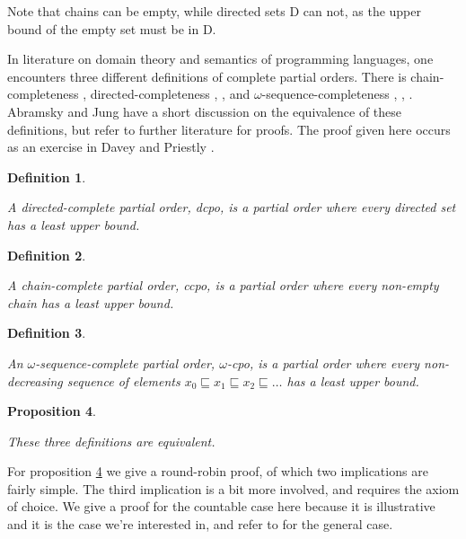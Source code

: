 \documentclass[a4paper]{article}
\newcommand{\below}{\sqsubseteq}
\newtheorem{definition}{Definition}[section]
\newtheorem{proposition}[definition]{Proposition}
\begin{document}
Note that chains can be empty, while directed sets D can not, as the upper bound
of the empty set must be in D.

In literature on domain theory and semantics of programming languages, one
encounters three different definitions of complete partial orders.  There is
chain-completeness \cite{Moschovakis1994}, directed-completeness
\cite{DaveyPriestly1990}, \cite{Gunter1992}, and $\omega$-sequence-completeness
\cite{Allison1986}, \cite{Winskel1993}, \cite{BarrWells1990}. Abramsky and Jung
\cite{Abramsky1994} have a short discussion on the equivalence of these
definitions, but refer to further literature for proofs. The proof given here
occurs as an exercise in Davey and Priestly \cite{DaveyPriestly1990}.


\begin{definition} \label{defCpoDirectedComplete}

A directed-complete partial order, \emph{dcpo}, is a partial order where every
directed set has a least upper bound.

\end{definition}


\begin{definition} \label{defCpoChainComplete}

A chain-complete partial order, \emph{ccpo}, is a partial order where every
non-empty chain has a least upper bound.

\end{definition}


\begin{definition} \label{defCpoOmegaSequenceComplete}

An $\omega$-sequence-complete partial order, \emph{$\omega$-cpo}, is a partial
order where every non-decreasing sequence of elements $x_0 \below x_1 \below x_2
\below \ldots $ has a least upper bound.

\end{definition}


\begin{proposition} \label{propDefinitionsAreEquivalent}

These three definitions are equivalent.

\end{proposition}

For proposition \ref{propDefinitionsAreEquivalent} we give a round-robin proof,
of which two implications are fairly simple. The third implication is a bit more
involved, and requires the axiom of choice. We give a proof for the countable
case here because it is illustrative and it is the case we're interested in, and
refer to \cite{Markowsky1976} for the general case.
\end{document}
